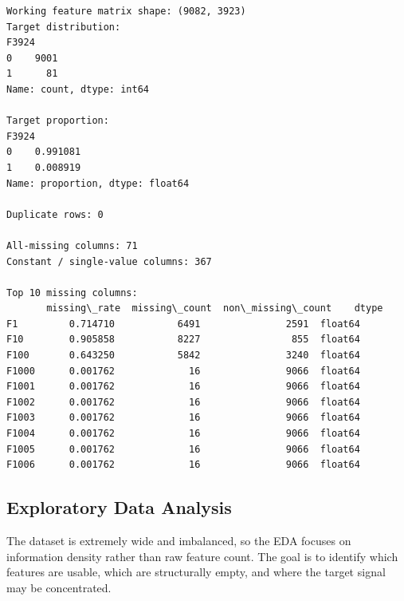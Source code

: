 \documentclass[11pt]{article}
\begin{document}
    \begin{Verbatim}[commandchars=\\\{\}]
Working feature matrix shape: (9082, 3923)
Target distribution:
F3924
0    9001
1      81
Name: count, dtype: int64

Target proportion:
F3924
0    0.991081
1    0.008919
Name: proportion, dtype: float64

Duplicate rows: 0

All-missing columns: 71
Constant / single-value columns: 367

Top 10 missing columns:
       missing\_rate  missing\_count  non\_missing\_count    dtype
F1         0.714710           6491               2591  float64
F10        0.905858           8227                855  float64
F100       0.643250           5842               3240  float64
F1000      0.001762             16               9066  float64
F1001      0.001762             16               9066  float64
F1002      0.001762             16               9066  float64
F1003      0.001762             16               9066  float64
F1004      0.001762             16               9066  float64
F1005      0.001762             16               9066  float64
F1006      0.001762             16               9066  float64
    \end{Verbatim}

    \subsection{Exploratory Data Analysis}\label{exploratory-data-analysis}

The dataset is extremely wide and imbalanced, so the EDA focuses on
information density rather than raw feature count. The goal is to
identify which features are usable, which are structurally empty, and
where the target signal may be concentrated.
\end{document}

